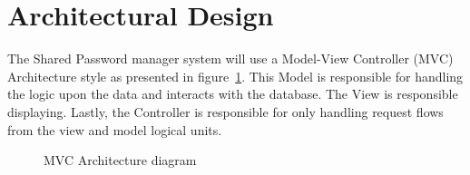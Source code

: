 \documentclass[letterpaper,12pt,oneside,listof=totoc]{scrreprt}
\begin{document}
\section{Architectural Design}
The Shared Password manager system will use a Model-View Controller (MVC) Architecture style as presented in figure~\ref{arch}. This Model is responsible for handling the logic upon the data and interacts with the database. The View is responsible displaying. Lastly, the Controller is responsible for only handling request flows from the view and model logical units. 


\begin{figure}
\centering
{}
\caption{MVC Architecture diagram}
\label{arch}
\end{figure}
\end{document}
